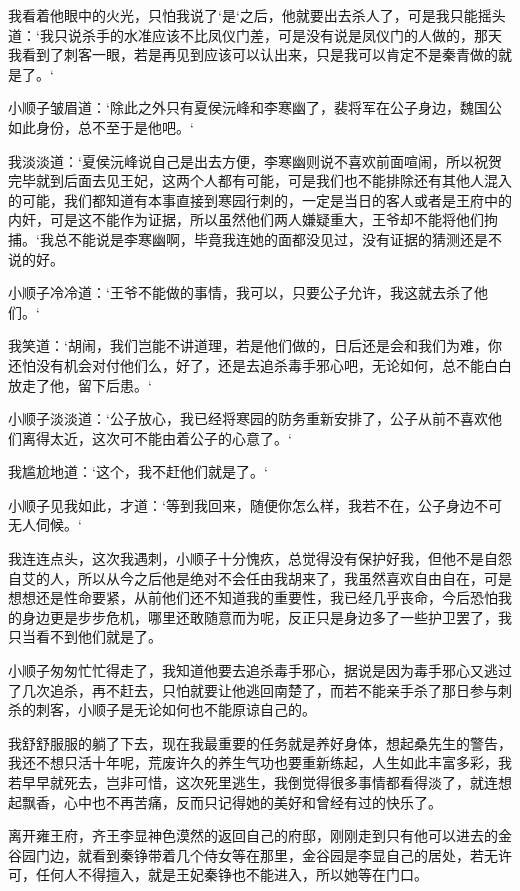 我看着他眼中的火光，只怕我说了‘是‘之后，他就要出去杀人了，可是我只能摇头道：‘我只说杀手的水准应该不比凤仪门差，可是没有说是凤仪门的人做的，那天我看到了刺客一眼，若是再见到应该可以认出来，只是我可以肯定不是秦青做的就是了。‘

小顺子皱眉道：‘除此之外只有夏侯沅峰和李寒幽了，裴将军在公子身边，魏国公如此身份，总不至于是他吧。‘

我淡淡道：‘夏侯沅峰说自己是出去方便，李寒幽则说不喜欢前面喧闹，所以祝贺完毕就到后面去见王妃，这两个人都有可能，可是我们也不能排除还有其他人混入的可能，我们都知道有本事直接到寒园行刺的，一定是当日的客人或者是王府中的内奸，可是这不能作为证据，所以虽然他们两人嫌疑重大，王爷却不能将他们拘捕。‘我总不能说是李寒幽啊，毕竟我连她的面都没见过，没有证据的猜测还是不说的好。

小顺子冷冷道：‘王爷不能做的事情，我可以，只要公子允许，我这就去杀了他们。‘

我笑道：‘胡闹，我们岂能不讲道理，若是他们做的，日后还是会和我们为难，你还怕没有机会对付他们么，好了，还是去追杀毒手邪心吧，无论如何，总不能白白放走了他，留下后患。‘

小顺子淡淡道：‘公子放心，我已经将寒园的防务重新安排了，公子从前不喜欢他们离得太近，这次可不能由着公子的心意了。‘

我尴尬地道：‘这个，我不赶他们就是了。‘

小顺子见我如此，才道：‘等到我回来，随便你怎么样，我若不在，公子身边不可无人伺候。‘

我连连点头，这次我遇刺，小顺子十分愧疚，总觉得没有保护好我，但他不是自怨自艾的人，所以从今之后他是绝对不会任由我胡来了，我虽然喜欢自由自在，可是想想还是性命要紧，从前他们还不知道我的重要性，我已经几乎丧命，今后恐怕我的身边更是步步危机，哪里还敢随意而为呢，反正只是身边多了一些护卫罢了，我只当看不到他们就是了。

小顺子匆匆忙忙得走了，我知道他要去追杀毒手邪心，据说是因为毒手邪心又逃过了几次追杀，再不赶去，只怕就要让他逃回南楚了，而若不能亲手杀了那日参与刺杀的刺客，小顺子是无论如何也不能原谅自己的。

我舒舒服服的躺了下去，现在我最重要的任务就是养好身体，想起桑先生的警告，我还不想只活十年呢，荒废许久的养生气功也要重新练起，人生如此丰富多彩，我若早早就死去，岂非可惜，这次死里逃生，我倒觉得很多事情都看得淡了，就连想起飘香，心中也不再苦痛，反而只记得她的美好和曾经有过的快乐了。

离开雍王府，齐王李显神色漠然的返回自己的府邸，刚刚走到只有他可以进去的金谷园门边，就看到秦铮带着几个侍女等在那里，金谷园是李显自己的居处，若无许可，任何人不得擅入，就是王妃秦铮也不能进入，所以她等在门口。

